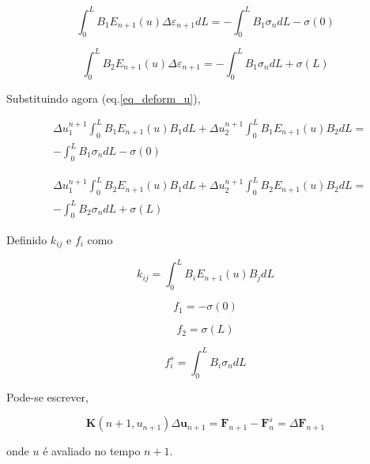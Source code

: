 \documentclass[12pt,a4paper]{article}
\newcommand{\diff}[1]{d#1}
\begin{document}
\begin{equation}
\int_0^L B_1 E_{n+1}\left(u\right) \Delta\varepsilon_{n+1} \diff{L}= -\int_0^L B_1 \sigma_{n} \diff{L} - \sigma\left(0\right)
\end{equation}


\begin{equation}
\int_0^L B_2 E_{n+1}\left(u\right) \Delta\varepsilon_{n+1}  = -\int_0^L B_1 \sigma_{n}\diff{L} + \sigma\left(L\right)
\end{equation}



Substituindo agora (eq.\ref{eq_deform_u}),

\begin{equation}
\begin{split}
&\Delta u_1^{n+1} \int_0^L B_1E_{n+1}\left(u\right) B_1 \diff{L} + \Delta u_2^{n+1} \int_0^L B_1E_{n+1}\left(u\right) B_2 \diff{L} =\\
&-\int_0^L B_1 \sigma_{n}\diff{L} - \sigma\left(0\right)
\end{split}
\end{equation}

\begin{equation}
\begin{split}
&\Delta u_1^{n+1} \int_0^L B_2 E_{n+1}\left(u\right) B_1 \diff{L} + \Delta u_2^{n+1} \int_0^L B_2 E_{n+1}\left(u\right) B_2 \diff{L} =\\
&-\int_0^L B_2 \sigma_{n}\diff{L} + \sigma\left(L\right)
\end{split}
\end{equation}

Definido $k_{ij}$ e $f_i$ como

\begin{equation}
k_{ij} = \int_0^L B_i E_{n+1}\left(u\right) B_j \diff{L}
\end{equation}

\begin{equation}
f_{1} = -\sigma\left(0\right)
\end{equation}

\begin{equation}
f_{2} = \sigma\left(L\right)
\end{equation}

\begin{equation}
f^s_{i} = \int_0^L B_i \sigma_{n}\diff{L}
\end{equation}

Pode-se escrever,

\begin{equation}
\mathbf{K}(n+1, u_{n+1}) \Delta \mathbf{u}_{n+1} = \mathbf{F}_{n+1} - \mathbf{F}^s_n = \Delta \mathbf{F}_{n+1}
\end{equation}

\noindent
onde $u$ é avaliado no tempo $n+1$.
 
 
\end{document}
